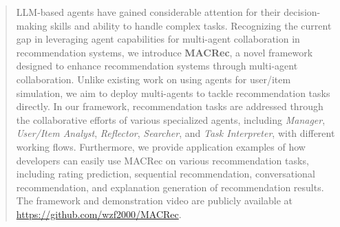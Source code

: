 \begin{abstract}
LLM-based agents have gained considerable attention for their decision-making skills and ability to handle complex tasks.
Recognizing the current gap in leveraging agent capabilities for multi-agent collaboration in recommendation systems, we introduce \textbf{MACRec}, a novel framework designed to enhance recommendation systems through multi-agent collaboration.
Unlike existing work on using agents for user/item simulation, we aim to deploy multi-agents to tackle recommendation tasks directly.
In our framework, recommendation tasks are addressed through the collaborative efforts of various specialized agents, including \textsl{Manager}, \textsl{User/Item Analyst}, \textsl{Reflector}, \textsl{Searcher}, and \textsl{Task Interpreter}, with different working flows.
Furthermore, we provide application examples of how developers can easily use MACRec on various recommendation tasks, including rating prediction, sequential recommendation, conversational recommendation,
and explanation generation of recommendation results.
The framework and demonstration video are publicly available at \href{https://github.com/wzf2000/MACRec}{https://github.com/wzf2000/MACRec}.


\end{abstract}

